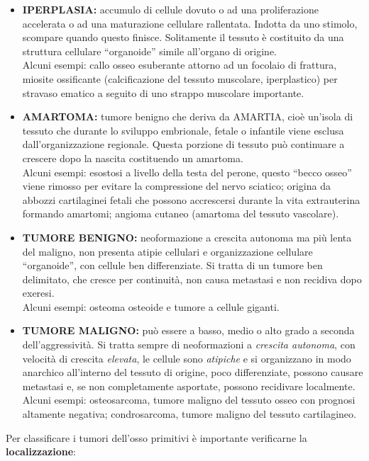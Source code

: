 \begin{itemize}
\item
  \textbf{IPERPLASIA:} accumulo di cellule dovuto o ad una proliferazione accelerata o ad una maturazione cellulare rallentata.
  Indotta da uno stimolo, scompare quando questo finisce. Solitamente il tessuto è costituito da una struttura cellulare ``organoide'' simile all'organo di origine.
\\
Alcuni esempi: callo osseo esuberante attorno ad un focolaio di frattura, miosite ossificante (calcificazione del tessuto muscolare, iperplastico) per stravaso ematico a seguito di uno strappo muscolare
importante.
\item
  \textbf{AMARTOMA:} tumore benigno che deriva da AMARTIA, cioè un'isola di tessuto che durante lo sviluppo embrionale, fetale o infantile viene esclusa dall'organizzazione regionale. Questa porzione di tessuto può continuare a crescere dopo la nascita costituendo un amartoma.
\\
Alcuni esempi: esostosi a livello della testa del perone, questo ``becco osseo'' viene rimosso per evitare la compressione del nervo sciatico;
origina da abbozzi cartilaginei fetali che possono accrescersi durante la vita extrauterina formando amartomi; angioma cutaneo (amartoma del tessuto vascolare).
\item
  \textbf{TUMORE BENIGNO:} neoformazione a crescita autonoma ma più lenta del maligno, non presenta atipie cellulari e organizzazione cellulare ``organoide'', con cellule ben differenziate. Si tratta di un tumore ben delimitato, che cresce per continuità, non causa metastasi e non recidiva dopo exeresi.
\\
Alcuni esempi: osteoma osteoide e tumore a cellule giganti.
\item
  \textbf{TUMORE MALIGNO:} può essere a basso, medio o alto grado a seconda dell'aggressività.
Si tratta sempre di neoformazioni a \emph{crescita autonoma}, con velocità di crescita \emph{elevata}, le cellule sono \emph{atipiche} e si organizzano in modo anarchico all'interno del tessuto di origine, poco differenziate, possono causare metastasi e, se non completamente asportate, possono recidivare localmente.
\\
Alcuni esempi: osteosarcoma, tumore maligno del tessuto osseo con prognosi altamente negativa; condrosarcoma, tumore maligno del tessuto cartilagineo.
\end{itemize}

Per classificare i tumori dell'osso primitivi è importante verificarne la \textbf{localizzazione}:

